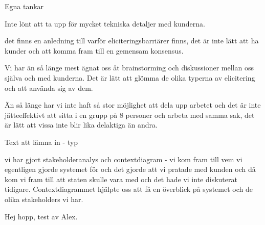 \documentclass[a4paper]{article}
\begin{document}
Egna tankar

Inte lönt att ta upp för mycket tekniska detaljer med kunderna.

det finns en anledning till varför eliciteringsbarriärer finns, det är inte lätt att ha kunder och att komma fram till en gemensam konsensus.

Vi har än så länge mest ägnat oss åt brainstorming och diskussioner mellan oss själva och med kunderna. Det är lätt att glömma de olika typerna av elicitering och att använda sig av dem. 

Än så länge har vi inte haft så stor möjlighet att dela upp arbetet och det är inte jätteeffektivt att sitta i en grupp på 8 personer och arbeta med samma sak, det är lätt att vissa inte blir lika delaktiga än andra. 

Text att lämna in - typ

vi har gjort stakeholderanalys och contextdiagram - vi kom fram till vem vi egentligen gjorde systemet för och det gjorde att vi pratade med kunden och då kom vi fram till att staten skulle vara med och det hade vi inte diskuterat tidigare. Contextdiagrammet hjälpte oss att få en överblick på systemet och de olika stakeholders vi har. 

Hej hopp, test av Alex.
\end{document}
